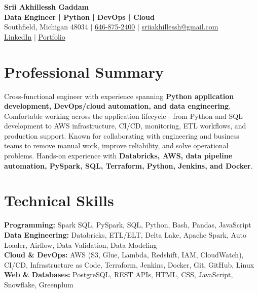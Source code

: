 \documentclass[letterpaper,10pt]{article}
\begin{document}
\fontsize{9.35pt}{10.45pt}\selectfont

\begin{center}
    {\LARGE \textbf{Srii Akhillessh Gaddam}} \\[-1pt]
    \textbf{Data Engineer | Python | DevOps | Cloud} \\[2pt]
    Southfield, Michigan 48034 $|$
    \href{tel:6468752400}{646-875-2400} $|$
    \href{mailto:sriiakhillessh@gmail.com}{sriiakhillessh@gmail.com} \\[1pt]
    \href{https://www.linkedin.com/in/srii-akhiilessh-gaddam-b48668191/}{LinkedIn} $|$
    \href{https://sriiakhillesshg.github.io/portfolio/}{Portfolio}
\end{center}
\vspace{-8pt}

\section{Professional Summary}
\small{Cross-functional engineer with experience spanning \textbf{Python application development, DevOps/cloud automation, and data engineering}. Comfortable working across the application lifecycle - from Python and SQL development to AWS infrastructure, CI/CD, monitoring, ETL workflows, and production support. Known for collaborating with engineering and business teams to remove manual work, improve reliability, and solve operational problems. Hands-on experience with \textbf{Databricks, AWS, data pipeline automation, PySpark, SQL, Terraform, Python, Jenkins, and Docker}.}

\section{Technical Skills}
\small{
\textbf{Programming:} Spark SQL, PySpark, SQL, Python, Bash, Pandas, JavaScript \\
\textbf{Data Engineering:} Databricks, ETL/ELT, Delta Lake, Apache Spark, Auto Loader, Airflow, Data Validation, Data Modeling \\
\textbf{Cloud \& DevOps:} AWS (S3, Glue, Lambda, Redshift, IAM, CloudWatch), CI/CD, Infrastructure as Code, Terraform, Jenkins, Docker, Git, GitHub, Linux \\
\textbf{Web \& Databases:} PostgreSQL, REST APIs, HTML, CSS, JavaScript, Snowflake, Greenplum
}
\end{document}
